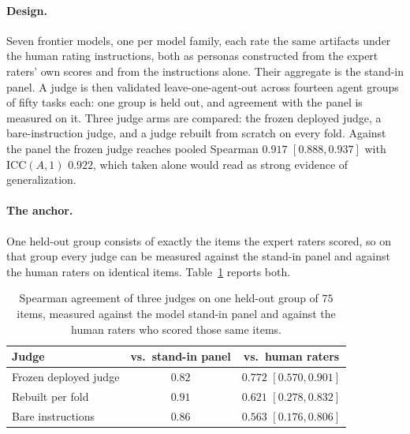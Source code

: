\paragraph{Design.}
Seven frontier models, one per model family, each rate the same artifacts under the human rating instructions, both as personas constructed from the expert raters' own scores and from the instructions alone.
Their aggregate is the stand-in panel.
A judge is then validated leave-one-agent-out across fourteen agent groups of fifty tasks each: one group is held out, and agreement with the panel is measured on it.
Three judge arms are compared: the frozen deployed judge, a bare-instruction judge, and a judge rebuilt from scratch on every fold.
Against the panel the frozen judge reaches pooled Spearman $0.917$ $[0.888, 0.937]$ with $\mathrm{ICC}(A,1)$ $0.922$, which taken alone would read as strong evidence of generalization.

\paragraph{The anchor.}
One held-out group consists of exactly the items the expert raters scored, so on that group every judge can be measured against the stand-in panel and against the human raters on identical items.
Table~\ref{tab:app-standin-vs-human} reports both.

\begin{table}[H]
\centering\small
\begin{tabular}{@{}lcc@{}}
\toprule
Judge & vs.\ stand-in panel & vs.\ human raters \\
\midrule
Frozen deployed judge & $0.82$ & $0.772$ $[0.570, 0.901]$ \\
Rebuilt per fold & $0.91$ & $0.621$ $[0.278, 0.832]$ \\
Bare instructions & $0.86$ & $0.563$ $[0.176, 0.806]$ \\
\bottomrule
\end{tabular}
\caption{Spearman agreement of three judges on one held-out group of $75$ items, measured against the model stand-in panel and against the human raters who scored those same items.}
\label{tab:app-standin-vs-human}
\end{table}

